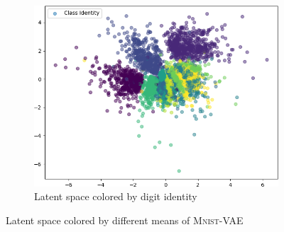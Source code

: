 \begin{figure}
\begin{subfigure}{.24\textwidth}
        \includegraphics[width=\textwidth]{images/latent_spaces/mnist/vae/embeddings_mu_6.png}
        \caption{Latent space colored by digit identity}
        \label{subfig:vae_mnist_latent_space_identity}
    \end{subfigure}
    \caption[\textsc{Mnist}-VAE - Latent Space]{Latent space colored by different means of \textsc{Mnist}-\ac{VAE}}
    \label{fig:vae_latent_space_mnist}
\end{figure}

